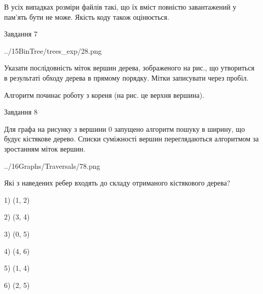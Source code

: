 \documentclass[12pt, ukrainian]{article}
\begin{document}
{В усіх випадках розміри файлів такі, що їх вміст повністю завантажений у пам'ять бути не може. Якість коду також оцінюється.



\vspace{10mm}\par

\newpage
\begin{minipage}[t]{9.7cm}
               
{\begin{center}Завдання {7}\end{center}}
\vspace{-4mm}

\begin{center}
	{../15BinTree/trees_exp/28.png}
\end{center}
Указати послідовність міток вершин дерева, зображеного на рис., що утвориться в результаті обходу дерева в прямому порядку. Мітки записувати через пробіл.\par Алгоритм починає роботу з кореня (на рис. це верхня вершина).\par

\end{minipage}
\vline \hspace{8mm}
\begin{minipage}[t]{8.0cm}
               
{\begin{center}Завдання {8}\end{center}}
\vspace{-4mm}
Для графа на рисунку з вершини 0 запущено алгоритм пошуку в ширину, що будує кістякове дерево. Списки суміжності вершин переглядаються алгоритмом за зростанням міток вершин.\par
\begin{center}
	{../16Graphs/Traversals/78.png}
\end{center}
\par Які з наведених ребер входять до складу отриманого кістякового дерева?\par
1) (1, 2)\par
2) (3, 4)\par
3) (0, 5)\par
4) (4, 6)\par
5) (1, 4)\par
6) (2, 5)\par
{\vskip 15pt} \par


\end{minipage}}
\end{document}
